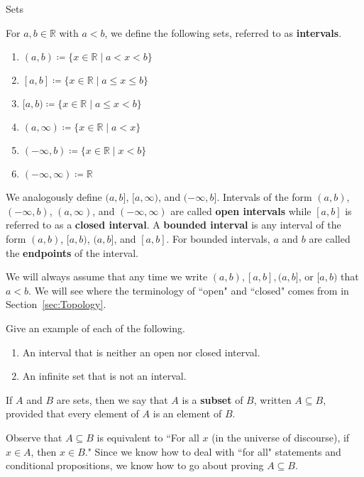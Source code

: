 \begin{section}{Sets}
\begin{definition}
For $a,b\in\mathbb{R}$ with $a<b$, we define the following sets, referred to as \textbf{intervals}.
\begin{enumerate}[label=\textrm{(\alph*)}]
\item $\boxed{(a,b)\coloneqq \{x\in\mathbb{R}\mid a<x<b\}}$
\item $\boxed{[a,b]\coloneqq \{x\in\mathbb{R}\mid a\leq x\leq b\}}$
\item $\boxed{[a,b)\coloneqq \{x\in\mathbb{R}\mid a\leq x< b\}}$
\item $\boxed{(a,\infty)\coloneqq \{x\in\mathbb{R}\mid a<x\}}$
\item $\boxed{(-\infty,b)\coloneqq \{x\in\mathbb{R}\mid x<b\}}$
\item $\boxed{(-\infty,\infty)\coloneqq \mathbb{R}}$
\end{enumerate}
We analogously define $\boxed{(a,b]}$, $\boxed{[a,\infty)}$, and $\boxed{(-\infty,b]}$. Intervals of the form $(a,b)$, $(-\infty,b)$, $(a,\infty)$, and $(-\infty,\infty)$ are called \textbf{open intervals} while $[a,b]$ is referred to as a \textbf{closed interval}. A \textbf{bounded interval} is any interval of the form $(a,b)$, $[a,b)$, $(a,b]$, and $[a,b]$. For bounded intervals, $a$ and $b$ are called the \textbf{endpoints} of the interval.
\end{definition}

We will always assume that any time we write $(a,b), [a,b], (a,b]$, or $[a,b)$ that $a<b$. We will see where the terminology of ``open" and ``closed" comes from in Section~\ref{sec:Topology}. 

\begin{problem}
Give an example of each of the following.
\begin{enumerate}[label=\textrm{(\alph*)}]
\item An interval that is neither an open nor closed interval.
\item An infinite set that is not an interval.
\end{enumerate}
\end{problem}

\begin{definition}
If $A$ and $B$ are sets, then we say that $A$ is a \textbf{subset} of $B$, written $\boxed{A\subseteq B}$, provided that every element of $A$ is an element of $B$.
\end{definition}

Observe that $A\subseteq B$ is equivalent to ``For all $x$ (in the universe of discourse), if $x\in A$, then $x\in B$."  Since we know how to deal with ``for all" statements and conditional propositions, we know how to go about proving $A\subseteq B$.


\end{section}

